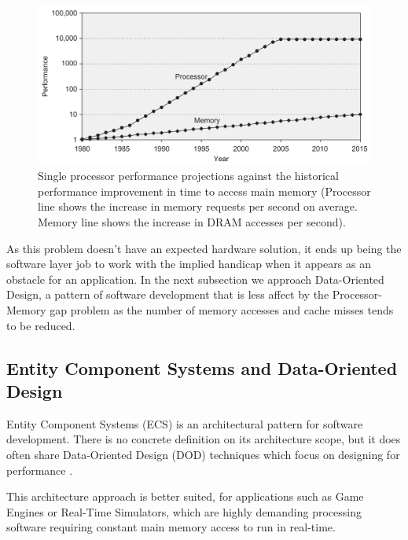    \begin{figure}[H]
        \caption{
        \label{fig:performance-gap-processor-memory}
            Single processor performance projections against the historical performance improvement in time to access main memory (Processor line shows the increase in memory requests per second on average. Memory line shows the increase in DRAM accesses per second).
        }
        \begin{center}
        \includegraphics[width=1\textwidth]{images/performance-gap-processor-memory.png}
        \end{center}
    \end{figure}

    As this problem doesn't have an expected hardware solution, it ends up being the software layer job to work with the implied handicap when it appears as an obstacle for an application. In the next subsection we approach Data-Oriented Design, a pattern of software development that is less affect by the Processor-Memory gap problem as the number of memory accesses and cache misses tends to be reduced.
    
\subsection{Entity Component Systems and Data-Oriented Design}

    Entity Component Systems (ECS) is an architectural pattern for software development. There is no concrete definition on its architecture scope, but it does often share Data-Oriented Design (DOD) techniques which focus on designing for performance \cite{llopis-game-engine-gems-2}.
    
    This architecture approach is better suited, for applications such as Game Engines or Real-Time Simulators, which are highly demanding processing software requiring constant main memory access to run in real-time. 
    
